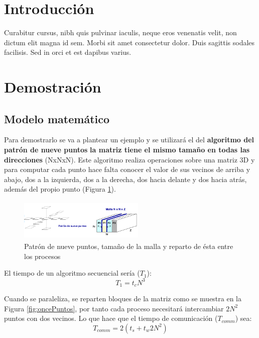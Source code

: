 \documentclass[10pt,twocolumn,a4paper]{article}
\begin{document}
\section{Introducción}

Curabitur cursus, nibh quis pulvinar iaculis, neque eros venenatis velit, non dictum elit magna id sem. Morbi sit amet consectetur dolor. Duis sagittis sodales facilisis. Sed in orci et est dapibus varius. 
\section{Demostración}
\subsection{Modelo matemático}
Para demostrarlo se va a plantear un ejemplo y se utilizará el del \textbf{algoritmo del patrón de nueve puntos} \cite{Almeida2008} \textbf{la matriz tiene el mismo tamaño en todas las direcciones} (NxNxN). Este algoritmo realiza operaciones sobre una matriz 3D y para computar cada punto hace falta conocer el valor de sus vecinos de arriba y abajo, dos a la izquierda, dos a la derecha, dos hacia delante y dos hacia atrás, además del propio punto (Figura \ref{fig:nuevePuntos}).
\begin{figure}[H]
\begin{center}
	\includegraphics[height=2cm, width=6cm]{nuevePuntos}
	\caption{Patrón de nueve puntos, tamaño de la malla y reparto de ésta entre los procesos}
	\label{fig:nuevePuntos}
	\end{center}
\end{figure}
El tiempo de un algoritmo secuencial sería ($T_{1}$):
\begin{equation}
	T_{1} = t_{c}N^{3}
\end{equation}

Cuando se paraleliza, se reparten bloques de la matriz como se muestra en la Figura \ref{fig:oncePuntos}, por tanto cada proceso necesitará intercambiar $2N^{2}$ puntos con dos vecinos. Lo que hace que el tiempo de comunicación ($T_{comm}$) sea:
\begin{equation}
	T_{comm} = 2(t_{s} + t_{w}2N^{2})
\end{equation}
\end{document}
